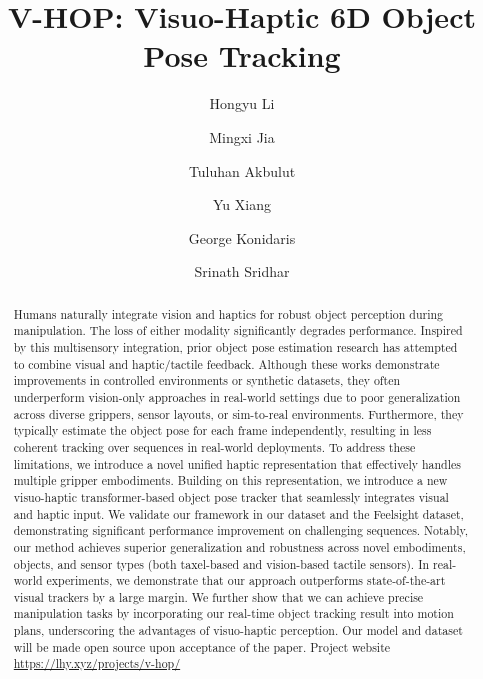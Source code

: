 \documentclass[11pt, a4paper, logo, twocolumn]{brown}
\newcommand{\shortname}{V-HOP\xspace}
\begin{document}
\title{\shortname: Visuo-Haptic 6D Object Pose Tracking}
\runningtitle{\shortname: Visuo-Haptic 6D Object Pose Tracking}

\author[1]{Hongyu Li}
\author[1]{Mingxi Jia}
\author[1]{Tuluhan Akbulut}
\author[2]{Yu Xiang}
\author[1]{George Konidaris}
\author[1]{Srinath Sridhar}

\begin{abstract}
Humans naturally integrate vision and haptics for robust object perception during manipulation. The loss of either modality significantly degrades performance.
Inspired by this multisensory integration, prior object pose estimation research has attempted to combine visual and haptic/tactile feedback.
Although these works demonstrate improvements in controlled environments or synthetic datasets, they often underperform vision-only approaches in real-world settings due to poor generalization across diverse grippers, sensor layouts, or sim-to-real environments.
Furthermore, they typically estimate the object pose for each frame independently, resulting in less coherent tracking over sequences in real-world deployments.
To address these limitations, we introduce a novel unified haptic representation that effectively handles multiple gripper embodiments.
Building on this representation, we introduce a new visuo-haptic transformer-based object pose tracker that seamlessly integrates visual and haptic input.
We validate our framework in our dataset and the Feelsight dataset, demonstrating significant performance improvement on challenging sequences.
Notably, our method achieves superior generalization and robustness across novel embodiments, objects, and sensor types (both taxel-based and vision-based tactile sensors).
In real-world experiments, we demonstrate that our approach outperforms state-of-the-art visual trackers by a large margin.
We further show that we can achieve precise manipulation tasks by incorporating our real-time object tracking result into motion plans, underscoring the advantages of visuo-haptic perception.
Our model and dataset will be made open source upon acceptance of the paper.
Project website \url{https://lhy.xyz/projects/v-hop/}
\end{abstract}

\maketitle
\end{document}
